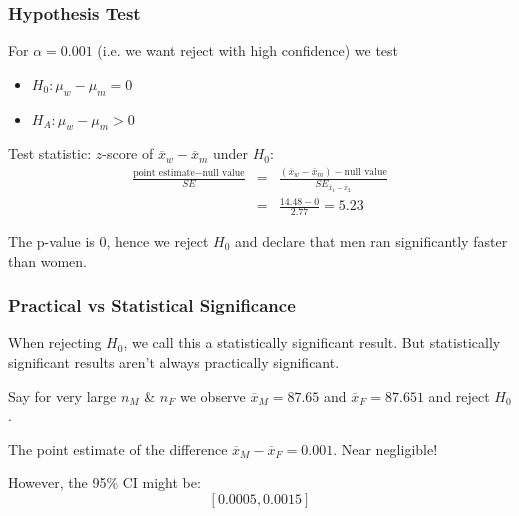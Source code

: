 \documentclass[handout]{beamer}
\newcommand{\blue}[1]{\textcolor{blue2}{#1}}
\newcommand{\xbar}{\overline{x}}
\begin{document}
\begin{frame}[fragile]
\frametitle{Hypothesis Test}
%
%
For $\alpha=0.001$ (i.e. we want reject with high confidence) we test
\begin{itemize}
\item $H_0: \mu_w - \mu_m = 0$
\item $H_A: \mu_w - \mu_m > 0$
\end{itemize}

\pause\vspace{0.25cm}

Test statistic:  $z$-score of $\xbar_w - \xbar_m$ under $H_0$:
\begin{eqnarray*}
\frac{\mbox{point estimate} - \mbox{null value}}{SE} &=& \frac{(\xbar_w - \xbar_m) - \mbox{null value}}{SE_{\xbar_1 - \xbar_2}}\\
&=& \frac{14.48 - 0}{2.77} = 5.23
\end{eqnarray*}

\pause\vspace{0.25cm}

The p-value is $0$, hence we reject $H_0$ and declare that men ran significantly faster than women.  

\end{frame}


\begin{frame}
\frametitle{Practical vs Statistical Significance}
When rejecting $H_0$, we call this a \blue{statistically significant} result.  But statistically significant results aren't always \blue{practically significant}.

\pause\vspace{0.5cm}

Say for \blue{very} large $n_M$ \& $n_F$ we observe $\xbar_M = 87.65$ and $\xbar_F = 87.651$ and reject $H_0$.  

\pause\vspace{0.5cm}

The point estimate of the difference $\xbar_M - \xbar_F = 0.001$.  Near negligible!  

\pause\vspace{0.5cm}

However, the 95\% CI might be:
\[
[0.0005, 0.0015]
\]

\end{frame}
\end{document}
